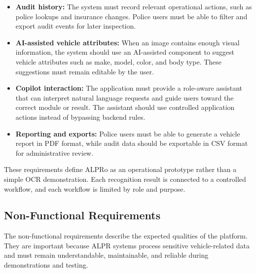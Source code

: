 ﻿\documentclass[12pt,a4paper]{article}
\begin{document}
\begin{itemize}
  \item \textbf{Audit history:} The system must record relevant operational actions, such as police lookups and insurance changes. Police users must be able to filter and export audit events for later inspection.

  \item \textbf{AI-assisted vehicle attributes:} When an image contains enough visual information, the system should use an AI-assisted component to suggest vehicle attributes such as make, model, color, and body type. These suggestions must remain editable by the user.

  \item \textbf{Copilot interaction:} The application must provide a role-aware assistant that can interpret natural language requests and guide users toward the correct module or result. The assistant should use controlled application actions instead of bypassing backend rules.

  \item \textbf{Reporting and exports:} Police users must be able to generate a vehicle report in PDF format, while audit data should be exportable in CSV format for administrative review.
\end{itemize}

These requirements define ALPRo as an operational prototype rather than a simple OCR demonstration. Each recognition result is connected to a controlled workflow, and each workflow is limited by role and purpose.

\subsection{Non-Functional Requirements}

The non-functional requirements describe the expected qualities of the platform. They are important because ALPR systems process sensitive vehicle-related data and must remain understandable, maintainable, and reliable during demonstrations and testing.
\end{document}
